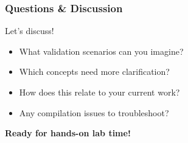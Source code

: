 \documentclass{beamer}
\begin{document}
\begin{frame}
\frametitle{Questions \& Discussion}
\begin{center}
\Large Let's discuss!
\end{center}

\begin{itemize}
    \item What validation scenarios can you imagine?
    \item Which concepts need more clarification?
    \item How does this relate to your current work?
    \item Any compilation issues to troubleshoot?
\end{itemize}

\vspace{1cm}
\begin{center}
\textbf{Ready for hands-on lab time!}
\end{center}
\end{frame}
\end{document}
